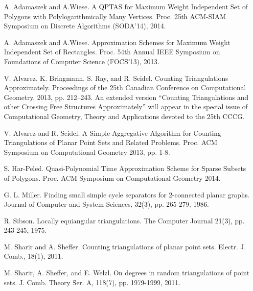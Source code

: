 \documentclass[a4paper]{article}
\begin{document}
{\small
\begin{thebibliography}{10}
A. Adamaszek and A.Wiese.
\newblock
 A QPTAS for Maximum Weight Independent Set of
 Polygons with Polylogarithmically Many Vertices.
\newblock 
Proc. 25th ACM-SIAM Symposium on Discrete Algorithms
(SODA'14), 2014.

A. Adamaszek and A.Wiese.
\newblock
Approximation Schemes for Maximum Weight Independent Set of
 Rectangles.
\newblock 
Proc. 54th Annual IEEE Symposium on Foundations of Computer Science
(FOCS'13), 2013.

V. Alvarez, K. Bringmann, S. Ray, and R. Seidel.
\newblock
Counting Triangulations Approximately.
\newblock
Proceedings of the 25th Canadian Conference on
Computational Geometry, 2013,
pp. 212--243. An extended version ``Counting Triangulations
and other Crossing Free Structures Approximately'' will
appear in the special issue of Computational Geometry, Theory
and Applications devoted to the 25th CCCG.

V. Alvarez and R. Seidel.
\newblock
A Simple Aggregative Algorithm for
Counting Triangulations of Planar Point Sets and
Related Problems.
\newblock
Proc. ACM Symposium on Computational Geometry 2013, pp. 1-8.

S. Har-Peled.
\newblock
Quasi-Polynomial Time Approximation Scheme for
Sparse Subsets of Polygons.
\newblock
Proc. ACM Symposium on Computational Geometry 2014.

G. L. Miller.
\newblock
Finding small simple cycle separators for $2$-connected
planar graphs.
\newblock
Journal of Computer and System Sciences, 32(3), pp. 265-279,
1986.  

R. Sibson.
\newblock
Locally equiangular triangulations.
\newblock
The Computer Journal 21(3), pp. 243-245, 1975.


M. Sharir and A. Sheffer.
\newblock
Counting triangulations of planar point sets.
\newblock
Electr. J. Comb., 18(1), 2011.

M. Sharir, A. Sheffer, and E. Welzl.
\newblock
On degrees in random triangulations of point sets.
\newblock
J. Comb. Theory Ser. A, 118(7), pp. 1979-1999, 2011.
\end{thebibliography}}
\end{document}
